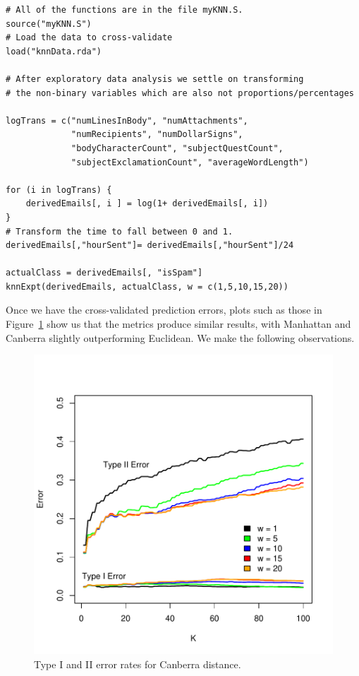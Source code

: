 \begin{verbatim}
# All of the functions are in the file myKNN.S.
source("myKNN.S")
# Load the data to cross-validate
load("knnData.rda")

# After exploratory data analysis we settle on transforming
# the non-binary variables which are also not proportions/percentages

logTrans = c("numLinesInBody", "numAttachments", 
             "numRecipients", "numDollarSigns", 
             "bodyCharacterCount", "subjectQuestCount",
             "subjectExclamationCount", "averageWordLength")

for (i in logTrans) {
    derivedEmails[, i ] = log(1+ derivedEmails[, i])
}
# Transform the time to fall between 0 and 1.
derivedEmails[,"hourSent"]= derivedEmails[,"hourSent"]/24

actualClass = derivedEmails[, "isSpam"]
knnExpt(derivedEmails, actualClass, w = c(1,5,10,15,20))
\end{verbatim}

Once we have the cross-validated prediction errors, plots such as those
in Figure~\ref{fig:knn1to100} show us that the metrics produce similar
results, with Manhattan and Canberra slightly outperforming Euclidean.
We make the following observations.

\begin{figure}
\includegraphics{Spam/knn1to100.pdf}
\caption{Type I and II error rates for Canberra distance.}
\label{fig:knn1to100}
\end{figure}

